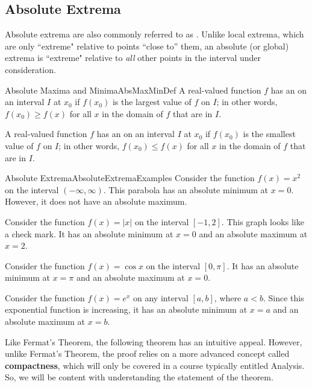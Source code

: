 \subsection{Absolute Extrema}\label{subsec:AbsoluteExtremaSubsection}

Absolute extrema are also commonly referred to as
. Unlike local extrema, which are
only ``extreme" relative to points ``close to'' them, an
absolute (or global) extrema is ``extreme" relative to \emph{all}
other points in the interval under consideration.

\begin{definition}{Absolute Maxima and Minima}{AbsMaxMinDef}
	A real-valued function $f$ has an 
	on an interval $I$ at $x_0$ if $f(x_0)$ is the largest value
	of $f$ on $I$; in other words, $f(x_0)\geq f(x)$ for all $x$
	in the domain of $f$ that are in $I$.
	
	\medskip
	A real-valued function $f$ has an 
	on an interval $I$ at $x_0$ if $f(x_0)$ is the smallest value
	of $f$ on $I$; in other words, $f(x_0)\leq f(x)$ for all $x$
	in the domain of $f$ that are in $I$.
\end{definition}

\begin{example}{Absolute Extrema}{AbsoluteExtremaExamples}
	Consider the function $f(x)=x^2$ on the interval $(-\infty,\infty)$.
	This parabola has an absolute minimum at $x=0$.
	However, it does not have an absolute maximum.
	
	\medskip
	Consider the function $f(x)=|x|$ on the interval $[-1,2]$.
	This graph looks like a check mark. It has an absolute minimum
	at $x=0$ and an absolute maximum at $x=2$.
	
	\medskip
	Consider the function $f(x)=\cos x$ on the interval $[0,\pi]$.
	It has an absolute minimum at $x=\pi$ and an absolute maximum at $x=0$.
	
	\medskip
	Consider the function $f(x)=e^x$ on any interval $[a,b]$,
	where $a<b$. Since this exponential function is increasing,
	it has an absolute minimum at $x=a$ and an absolute maximum at $x=b$.
\end{example}

Like Fermat's Theorem, the following theorem has an intuitive appeal.
However, unlike Fermat's Theorem, the proof relies on a more advanced
concept called \textbf{compactness}, which will only be covered in a course
typically entitled Analysis. So, we will be content with understanding the
statement of the theorem.

